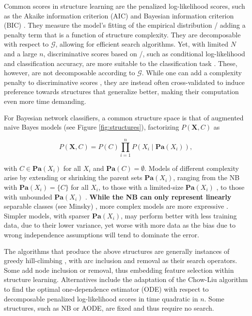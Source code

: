 Common scores in structure learning are the penalized log-likelihood
scores, such as the Akaike information criterion (AIC) \citep{Akaike74}
and Bayesian information criterion (BIC) \citep{Schwarz1978}. They
measure the model's fitting of the empirical distribution \pcxemp/
adding a penalty term that is a function of structure complexity. They
are decomposable with respect to \(\mathcal{G}\), allowing for efficient
search algorithms. Yet, with limited \(N\) and a large \(n\),
discriminative scores based on \pcgx/, such as conditional
log-likelihood and classification accuracy, are more suitable to the
classification task \citep{Friedman1997}. These, however, are not
decomposable according to \(\mathcal{G}\). While one can add a
complexity penalty to discriminative scores
\citep[e.g.,][]{grossman2004}, they are instead often cross-validated to
induce preference towards structures that generalize better, making
their computation even more time demanding.

For Bayesian network classifiers, a common \citep[see][]{Bielza14}
structure space is that of augmented naive Bayes \citep{Friedman1997}
models (see Figure \ref{fig:structures}), factorizing
\(P(\mathbf{X}, C)\) as

\begin{equation}
P(\mathbf{X}, C) = P(C) \prod_{i=1}^{n} P(X_i \mid \mathbf{Pa}(X_i)), \label{eq:augnb}
\end{equation}

\noindent with \(C \in \mathbf{Pa}(X_i)\) for all \(X_i\) and
\(\mathbf{Pa}(C) = \emptyset\). Models of different complexity arise by
extending or shrinking the parent sets \(\mathbf{Pa}(X_i)\), ranging
from the NB \citep{Minsky1961} with \(\mathbf{Pa}(X_i) = \{C \}\) for
all \(X_i\), to those with a limited-size \(\mathbf{Pa}(X_i)\)
\citep{Friedman1997,Sahami1996}, to those with unbounded
\(\mathbf{Pa}(X_i)\) \citep{Pernkopf2003}. \textbf{While the NB can only
represent linearly} separable classes (see Minsky) \citep{jaeger2003},
more complex models are more expressive \citep{Varando2015jmlr}. Simpler
models, with sparser \(\mathbf{Pa}(X_i)\), may perform better with less
training data, due to their lower variance, yet worse with more data as
the bias due to wrong independence assumptions will tend to dominate the
error.

The algorithms that produce the above structures are generally instances
of greedy hill-climbing \citep{Keogh2002,Sahami1996}, with arc inclusion
and removal as their search operators. Some \citep[e.g.,][]{Pazzani1996}
add node inclusion or removal, thus embedding feature selection
\citep{Guyon2003} within structure learning. Alternatives include the
adaptation \citep{Friedman1997} of the Chow-Liu \citep{Chow1968}
algorithm to find the optimal one-dependence estimator (ODE) with
respect to decomposable penalized log-likelihood scores in time
quadratic in \(n\). Some structures, such as NB or AODE, are fixed and
thus require no search.

